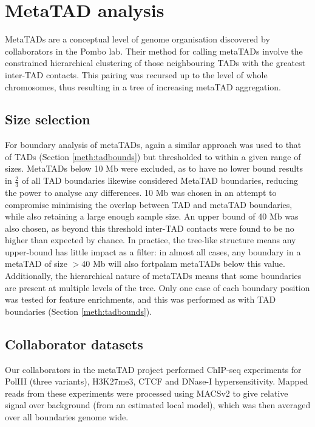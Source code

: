\documentclass[a4paper,11pt,oneside]{book}
\begin{document}
\section{MetaTAD analysis}\label{meth:meta}

MetaTADs are a conceptual level of genome organisation discovered by collaborators in the Pombo lab. Their method for calling metaTADs involve the constrained hierarchical clustering of those neighbouring TADs with the greatest inter-TAD contacts. This pairing was recursed up to the level of whole chromosomes, thus resulting in a tree of increasing metaTAD aggregation. 



\subsection{Size selection}\label{sec:metatad}

For boundary analysis of metaTADs, again a similar approach was used to that of TADs (Section \ref{meth:tadbounds}) but thresholded to within a given range of sizes. MetaTADs below 10 Mb were excluded, as to have no lower bound results in $\frac{2}{3}$ of all TAD boundaries likewise considered MetaTAD boundaries, reducing the power to analyse any differences. 10 Mb was chosen in an attempt to compromise minimising the overlap between TAD and metaTAD boundaries, while also retaining a large enough sample size. An upper bound of 40 Mb was also chosen, as beyond this threshold inter-TAD contacts were found to be no higher than expected by chance. In practice, the tree-like structure means any upper-bound has little impact as a filter: in almost all cases, any boundary in a metaTAD of size $> 40$ Mb will also fortpalam metaTADs below this value. Additionally, the hierarchical nature of metaTADs means that some boundaries are present at multiple levels of the tree. Only one case of each boundary position was tested for feature enrichments, and this was performed as with TAD boundaries (Section \ref{meth:tadbounds}).

\subsection{Collaborator datasets}\label{meth:metadata}
Our collaborators in the metaTAD project performed ChIP-seq experiments for PolIII (three variants), H$3$K$27$me$3$, CTCF and DNase-I hypersensitivity. Mapped reads from these experiments were processed using MACSv2\cite{Zhang2008} to give relative signal over background (from an estimated local model), which was then averaged over all boundaries genome wide. 
\end{document}
